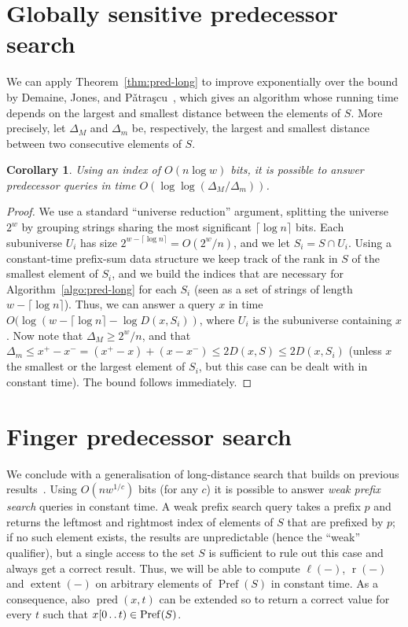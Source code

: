\documentclass[a4paper,11pt]{article}
\newtheorem{corollary}[theorem]{Corollary}
\newcommand{\?}{\mskip1.5mu}
\newcommand{\Patrascu}{P\v{a}tra\c{s}cu\xspace}
\def\..{\,\mathpunct{\ldotp\ldotp}} %
\DeclareMathOperator{\lrange}{\ell}
\DeclareMathOperator{\rrange}{r}
\DeclareMathOperator{\extent}{extent}
\DeclareMathOperator{\Pref}{Pref}
\DeclareMathOperator{\pred}{pred}
\begin{document}
\section{Globally sensitive predecessor search}

We can apply Theorem~\ref{thm:pred-long} to improve 
exponentially over the bound by Demaine, Jones, and 
\Patrascu~\cite{DemaineJoPa04}, which gives an algorithm whose running time
depends on the largest and smallest distance between the elements of $S$. 
More precisely, let
$\Delta_M$ and $\Delta_m$ be, respectively, the largest and smallest distance
between two consecutive elements of $S$.
\begin{corollary}
\label{cor:deltadelta}
Using an index of $O(n\log w)$ bits, it is possible to answer predecessor
queries in time $O(\log\log(\Delta_M/\Delta_m))$.
\end{corollary}
\begin{proof}
We use a standard ``universe reduction'' argument, splitting 
the universe $2^w$ by grouping strings sharing the most significant $\lceil \log
n\rceil$ bits. Each subuniverse $U_i$ has size $2^{w-\lceil \log
n\rceil}=O(2^w/n)$, and we let $S_i=S\cap U_i$. Using a constant-time
prefix-sum data structure we keep track of the rank in $S$ of the smallest
element of $S_i$, and we build the indices that are necessary for
Algorithm~\ref{algo:pred-long} for each $S_i$ (seen as a set of strings of
length $w-\lceil \log
n\rceil$). Thus, we can answer a query $x$ in time $O(\log(w-\lceil \log
n\rceil -\log D(x,S_i))$, where $U_i$ is the subuniverse containing $x$. Now
note that $\Delta_M\geq 2^w/n$, and that $\Delta_m\leq x^+-x^-
=(x^+-x)+(x-x^-)\leq 2D(x,S)\leq 2D(x,S_i)$ (unless $x$ the smallest or the
largest element of $S_i$, but this case can be dealt with in constant time). The
bound follows immediately.
\end{proof}

\section{Finger predecessor search}

We conclude with a generalisation of long-distance search that builds on previous results~\cite{BelazzouguiBoPaVi11b}.
Using $O(n w^{1/c})$ bits (for any $c$) it
is possible to answer \emph{weak prefix search} queries in constant time. A weak
prefix search query takes a prefix $p$ and returns the leftmost and rightmost
index of elements of $S$ that are prefixed by $p$; if no such element exists,
the results are unpredictable (hence the ``weak'' qualifier), but a single access to the set $S$ is sufficient
to rule out this case and always get a correct result. Thus, we will be
able to compute $\lrange(-)$, $\rrange(-)$ and $\extent(-)$ on arbitrary
elements of $\Pref(S)$ in constant time. As a consequence, also $\pred(x,t)$ can
be extended so to return a correct value for every $t$ such that
$x[0\..t)\in \Pref(S)$.
\end{document}
